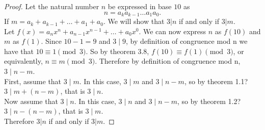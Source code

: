 \documentclass[12pt,leqno]{article}
\numberwithin{equation}{section}
\theoremstyle{definition}
\begin{document}
\begin{proof}[Proof]
Let the natural number $n$ be expressed in base $10$ as
\[n = a_k a_{k-1} \hdots a_1 a_0. \]
If $m = a_k + a_{k-1} + \hdots + a_1 + a_0$. We will show that $3|n$ if and only if $3|m$.\\

Let $f(x) = a_nx^n + a_{n-1}x^{n-1} + \hdots + a_0x^0$.  We can now express $n$ as $f(10)$ and $m$ as $f(1)$.  Since $10 - 1 = 9$ and $3 \mid 9$, by definition of congruence mod n we have that $10 \equiv 1 \pmod{3}$.  So by theorem 3.8, $f(10) \equiv f(1) \pmod{3}$, or equivalently, $n \equiv m \pmod{3}$.  Therefore by definition of congruence mod n, $3 \mid n - m$.\\

First, assume that $3 \mid m$.  In this case, $3 \mid m$ and $3 \mid n-m$, so by theorem 1.1? $3 \mid m + (n-m)$, that is $3\mid n$.\\

Now assume that $3 \mid n$.  In this case, $3 \mid n$ and $3 \mid n-m$, so by theorem 1.2? $3 \mid n - (n-m)$, that is $3\mid m$.\\

Therefore $3|n$ if and only if $3|m$.
\end{proof}
\end{document}
